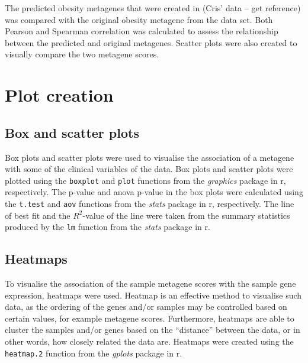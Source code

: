 
The predicted obesity metagenes that were created in (Cris' data -- get reference) was compared with the original obesity metagene from the \citet{Creighton2012} data set.
Both Pearson and Spearman correlation was calculated to assess the relationship between the predicted and original metagenes.
Scatter plots were also created to visually compare the two metagene scores.

\section{Plot creation}
\label{sec:plot_creation}

\subsection{Box and scatter plots}
\label{sub:box_and_scatter_plots}

Box plots and scatter plots were used to visualise the association of a metagene with some of the clinical variables of the data.
Box plots and scatter plots were plotted using the \texttt{boxplot} and \texttt{plot} functions from the \textit{graphics} package in \gls{r}, respectively.
The p-value and \gls{anova} p-value in the box plots were calculated using the \texttt{t.test} and \texttt{aov} functions from the \textit{stats} package in \gls{r}, respectively.
The line of best fit and the $R^2$-value of the line were taken from the summary statistics produced by the \texttt{lm} function from the \textit{stats} package in \gls{r}.

\subsection{Heatmaps}
\label{sub:heatmaps}

To visualise the association of the sample metagene scores with the sample gene expression, heatmaps were used.
Heatmap is an effective method to visualise such data, as the ordering of the genes and/or samples may be controlled based on certain values, for example metagene scores.
Furthermore, heatmaps are able to cluster the samples and/or genes based on the ``distance'' between the data, or in other words, how closely related the data are.
Heatmaps were created using the \texttt{heatmap.2} function from the \textit{gplots} package in \gls{r}.

